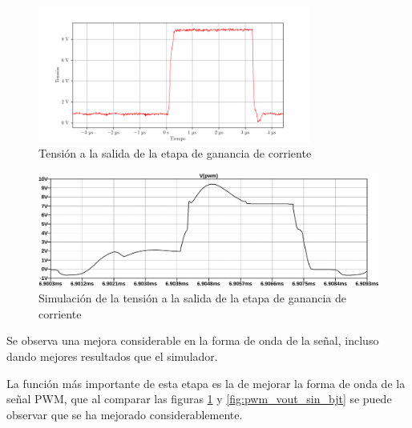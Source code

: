 
\begin{figure}[H]
    \centering
    \includegraphics[width=0.8\textwidth]{images/capturas-osciloscopio/17-11-2022/3.png}
    \caption{Tensión a la salida de la etapa de ganancia de corriente}
    \label{fig:osc_pwm_vout_disconnected}
\end{figure}

\begin{figure}[H]
    \centering
    \includegraphics[width=\textwidth]{images/sim/3.pdf}
    \caption{Simulación de la tensión a la salida de la etapa de ganancia de corriente}
    \label{fig:sim:osc_pwm_vout}
\end{figure}

Se observa una mejora considerable en la forma de onda de la señal, incluso dando mejores resultados que el simulador. %

La función más importante de esta etapa es la de mejorar la forma de onda de la señal PWM, que al comparar las figuras \ref{fig:osc_pwm_vout_disconnected} y \ref{fig:pwm_vout_sin_bjt} se puede observar que se ha mejorado considerablemente.

